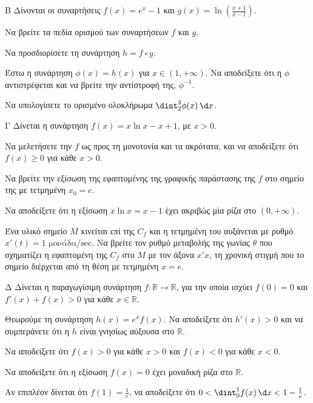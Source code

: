 \begin{thema}{Β}
Δίνονται οι συναρτήσεις $f(x) = e^x - 1$ και $\displaystyle g(x) = \ln\left(\frac{x+1}{x-1}\right)$.
\begin{erwthma}
    \item Να βρείτε τα πεδία ορισμού των συναρτήσεων $f$ και $g$. 
    \item Να προσδιορίσετε τη συνάρτηση $h = f \circ g$. 
    \item Έστω η συνάρτηση $\phi(x) = h(x)$ για $x \in (1, +\infty)$. Να αποδείξετε ότι η $\phi$ αντιστρέφεται και να βρείτε την αντίστροφή της, $\phi^{-1}$. 
    \item Να υπολογίσετε το ορισμένο ολοκλήρωμα $\dint_2^3 \phi(x)\,\d x$. 
\end{erwthma}
\end{thema}

\begin{thema}{Γ}
Δίνεται η συνάρτηση $f(x) = x\ln x - x + 1$, με $x>0$.
\begin{erwthma}
    \item Να μελετήσετε την $f$ ως προς τη μονοτονία και τα ακρότατα, και να αποδείξετε ότι $f(x)\geq 0$ για κάθε $x > 0$. 
    \item Να βρείτε την εξίσωση της εφαπτομένης της γραφικής παράστασης της $f$ στο σημείο της με τετμημένη $x_0 = e$. 
    \item Να αποδείξετε ότι η εξίσωση $x\ln x = x - 1$ έχει ακριβώς μία ρίζα στο $(0,+\infty)$. 
    \item Ένα υλικό σημείο $M$ κινείται επί της $C_f$ και η τετμημένη του αυξάνεται με ρυθμό $x'(t)=1 \text{ μονάδα/sec}$. Να βρείτε τον ρυθμό μεταβολής της γωνίας $\theta$ που σχηματίζει η εφαπτομένη της $C_f$ στο $M$ με τον άξονα $x'x$, τη χρονική στιγμή που το σημείο διέρχεται από τη θέση με τετμημένη $x=e$. 
\end{erwthma}
\end{thema}

\begin{thema}{Δ}
Δίνεται η παραγωγίσιμη συνάρτηση $f:\mathbb{R}\to\mathbb{R}$, για την οποία ισχύει $f(0)=0$ και $f'(x) + f(x) > 0$ για κάθε $x \in \mathbb{R}$.
\begin{erwthma}
    \item Θεωρούμε τη συνάρτηση $h(x)=e^x f(x)$. Να αποδείξετε ότι $h'(x) > 0$ και να συμπεράνετε ότι η $h$ είναι γνησίως αύξουσα στο $\mathbb{R}$. 
    \item Να αποδείξετε ότι $f(x)>0$ για κάθε $x>0$ και $f(x)<0$ για κάθε $x<0$. 
    \item Να αποδείξετε ότι η εξίσωση $f(x)=0$ έχει μοναδική ρίζα στο $\mathbb{R}$. 
    \item Αν επιπλέον δίνεται ότι $f(1)=\frac{1}{e}$, να αποδείξετε ότι $0 < \dint_0^1 f(x)\,\d x < 1 - \frac{1}{e}$. 
\end{erwthma}
\end{thema}